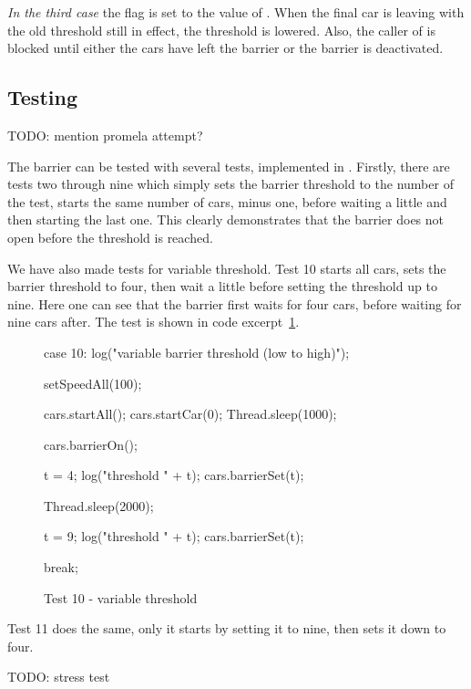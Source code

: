 \emph{In the third case} the flag  is set to
the value of . When the final car is leaving with the old
threshold still in effect, the threshold is lowered. Also, the caller
of  is blocked until either the cars have left the
barrier or the barrier is deactivated.


\subsection{Testing}
\label{sub:bar-test}
TODO: mention promela attempt?

The barrier can be tested with several tests, implemented in
. Firstly, there are tests two through nine which simply
sets the barrier threshold to the number of the test, starts the same number of cars, minus
one, before waiting a little and then starting the last one. This
clearly demonstrates that the barrier does not open before the threshold is reached.

We have also made tests for variable threshold. Test 10 starts all
cars, sets the barrier threshold to four, then wait a little before
setting the threshold up to nine. Here one can see that the barrier first
waits for four cars, before waiting for nine cars after. The test is
shown in code excerpt~\ref{lst:bar-test}.

\begin{figure}[H]
\begin{java}
case 10:
    log("variable barrier threshold (low to high)");

    setSpeedAll(100);

    cars.startAll();
    cars.startCar(0);
    Thread.sleep(1000);

    cars.barrierOn();

    t = 4;
    log("threshold " + t);
    cars.barrierSet(t);

    Thread.sleep(2000);

    t = 9;
    log("threshold " + t);
    cars.barrierSet(t);

    break;
\end{java}
\caption{Test 10 - variable threshold}
\label{lst:bar-test}
\end{figure}

Test 11 does the same, only it starts by setting it to nine, then sets
it down to four.

TODO: stress test
